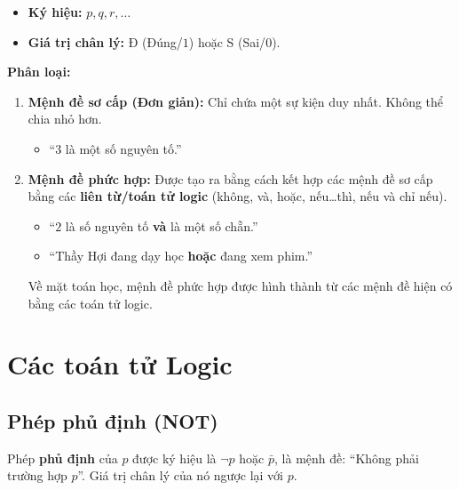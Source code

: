 \documentclass[12pt,a4paper]{article}
\begin{document}
\begin{itemize}
  \item \textbf{Ký hiệu:} $p, q, r, \dots$
  \item \textbf{Giá trị chân lý:} Đ (Đúng/$1$) hoặc S (Sai/$0$).
\end{itemize}

\textbf{Phân loại:}
\begin{enumerate}
  \item \textbf{Mệnh đề sơ cấp (Đơn giản):} Chỉ chứa một sự kiện duy nhất. Không thể chia nhỏ hơn.
  \begin{itemize}
    \item ``$3$ là một số nguyên tố.''
  \end{itemize}
  \item \textbf{Mệnh đề phức hợp:} Được tạo ra bằng cách kết hợp các mệnh đề sơ cấp bằng các \textbf{liên từ/toán tử logic} (không, và, hoặc, nếu\dots thì, nếu và chỉ nếu).
  \begin{itemize}
    \item ``$2$ là số nguyên tố \textbf{và} là một số chẵn.''
    \item ``Thầy Hợi đang dạy học \textbf{hoặc} đang xem phim.''
  \end{itemize}
  Về mặt toán học, mệnh đề phức hợp được hình thành từ các mệnh đề hiện có bằng các toán tử logic.
\end{enumerate}

\section{Các toán tử Logic}

\subsection{Phép phủ định (NOT)}

Phép \textbf{phủ định} của $p$ được ký hiệu là $\neg p$ hoặc $\bar{p}$, là mệnh đề: ``Không phải trường hợp $p$''. Giá trị chân lý của nó ngược lại với $p$.
\end{document}
